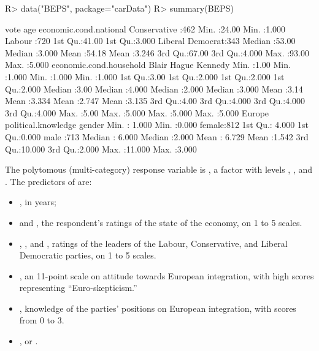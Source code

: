 \documentclass[
]{jss}
\providecommand{\tightlist}{%
  \setlength{\itemsep}{0pt}\setlength{\parskip}{0pt}}
\begin{document}
\begin{CodeChunk}
\begin{CodeInput}
R> data("BEPS", package="carData")
R> summary(BEPS)
\end{CodeInput}
\begin{CodeOutput}
               vote          age        economic.cond.national
 Conservative    :462   Min.   :24.00   Min.   :1.000         
 Labour          :720   1st Qu.:41.00   1st Qu.:3.000         
 Liberal Democrat:343   Median :53.00   Median :3.000         
                        Mean   :54.18   Mean   :3.246         
                        3rd Qu.:67.00   3rd Qu.:4.000         
                        Max.   :93.00   Max.   :5.000         
 economic.cond.household     Blair           Hague          Kennedy     
 Min.   :1.00            Min.   :1.000   Min.   :1.000   Min.   :1.000  
 1st Qu.:3.00            1st Qu.:2.000   1st Qu.:2.000   1st Qu.:2.000  
 Median :3.00            Median :4.000   Median :2.000   Median :3.000  
 Mean   :3.14            Mean   :3.334   Mean   :2.747   Mean   :3.135  
 3rd Qu.:4.00            3rd Qu.:4.000   3rd Qu.:4.000   3rd Qu.:4.000  
 Max.   :5.00            Max.   :5.000   Max.   :5.000   Max.   :5.000  
     Europe       political.knowledge    gender   
 Min.   : 1.000   Min.   :0.000       female:812  
 1st Qu.: 4.000   1st Qu.:0.000       male  :713  
 Median : 6.000   Median :2.000                   
 Mean   : 6.729   Mean   :1.542                   
 3rd Qu.:10.000   3rd Qu.:2.000                   
 Max.   :11.000   Max.   :3.000                   
\end{CodeOutput}
\end{CodeChunk}

The polytomous (multi-category) response variable is , a
factor with levels , , and
. The predictors of  are:

\begin{itemize}
\tightlist
\item
  , in years;
\item
   and , the
  respondent's ratings of the state of the economy, on 1 to 5 scales.
\item
  , , and , ratings of the leaders
  of the Labour, Conservative, and Liberal Democratic parties, on 1 to 5
  scales.
\item
  , an 11-point scale on attitude towards European
  integration, with high scores representing ``Euro-skepticism.''
\item
  , knowledge of the parties' positions on
  European integration, with scores from 0 to 3.
\item
  ,  or .
\end{itemize}
\end{document}
